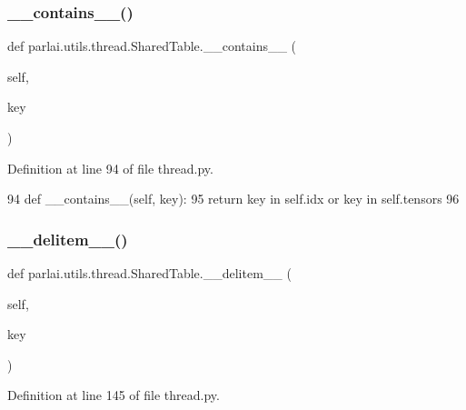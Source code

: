 \subsubsection{\texorpdfstring{\+\_\+\+\_\+contains\+\_\+\+\_\+()}{\_\_contains\_\_()}}
{\footnotesize\ttfamily def parlai.\+utils.\+thread.\+Shared\+Table.\+\_\+\+\_\+contains\+\_\+\+\_\+ (\begin{DoxyParamCaption}\item[{}]{self,  }\item[{}]{key }\end{DoxyParamCaption})}



Definition at line 94 of file thread.\+py.


\begin{DoxyCode}
94     \textcolor{keyword}{def }\_\_contains\_\_(self, key):
95         \textcolor{keywordflow}{return} key \textcolor{keywordflow}{in} self.idx \textcolor{keywordflow}{or} key \textcolor{keywordflow}{in} self.tensors
96 
\end{DoxyCode}
\mbox{\label{classparlai_1_1utils_1_1thread_1_1SharedTable_a567947ad20bdc1ad18815fc1883ea247}} 
\subsubsection{\texorpdfstring{\+\_\+\+\_\+delitem\+\_\+\+\_\+()}{\_\_delitem\_\_()}}
{\footnotesize\ttfamily def parlai.\+utils.\+thread.\+Shared\+Table.\+\_\+\+\_\+delitem\+\_\+\+\_\+ (\begin{DoxyParamCaption}\item[{}]{self,  }\item[{}]{key }\end{DoxyParamCaption})}



Definition at line 145 of file thread.\+py.


